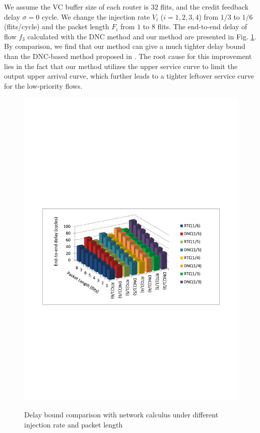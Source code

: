 \documentclass[preprint]{elsarticle}
\begin{document}
We assume the VC buffer size of each router is $32$ flits, and the credit feedback delay $\sigma=0$ cycle. We change the injection rate $V_i$ ($i=1,2,3,4$) from $1/3$ to $1/6$ (flits/cycle) and the packet length $F_i$ from $1$ to $8$ flits. The end-to-end delay of flow $f_3$ calculated with the DNC method and our method are presented in Fig. \ref{comparison}. By comparison, we find that our method can give a much tighter delay bound than the DNC-based method proposed in \cite{Qian489900}. The root cause for this improvement lies in the fact that our method utilizes the upper service curve to limit the output upper arrival curve, which further leads to a tighter leftover service curve for the low-priority flows.
\begin{figure}
  \centering
  \includegraphics[scale=0.8]{figures/rtcvsdnc.pdf}\\
  \caption{Delay bound comparison with network calculus under different injection rate and packet length}\label{comparison}
\end{figure}
\end{document}
